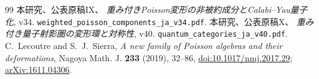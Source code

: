 \begin{thebibliography}{99}
 本研究、公表原稿IX、
\emph{重み付きPoisson変形の非被約成分とCalabi--Yau量子化}, v34.
\nolinkurl{weighted_poisson_components_ja_v34.pdf}.
 本研究、公表原稿X、
\emph{重み付き量子射影圏の変形環と対称性}, v40.
\nolinkurl{quantum_categories_ja_v40.pdf}.
C.~Lecoutre and S.~J.~Sierra,
\emph{A new family of Poisson algebras and their deformations},
Nagoya Math. J. \textbf{233} (2019), 32--86,
\href{https://doi.org/10.1017/nmj.2017.29}{doi:10.1017/nmj.2017.29};
\href{https://arxiv.org/abs/1611.04306}{arXiv:1611.04306}.








\end{thebibliography}
